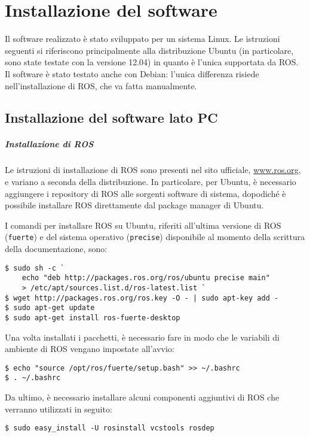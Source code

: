 \chapter{Installazione del software}
\label{cap:installazione}

Il software realizzato è stato sviluppato per un sistema Linux. Le istruzioni seguenti si riferiscono principalmente alla distribuzione Ubuntu (in particolare, sono state testate con la versione 12.04) in quanto è l'unica supportata da ROS. Il software è stato testato anche con Debian: l'unica differenza risiede nell'installazione di ROS, che va fatta manualmente.

\section{Installazione del software lato PC}
\paragraph{Installazione di ROS} Le istruzioni di installazione di ROS sono presenti nel sito ufficiale, \url{www.ros.org}, e variano a seconda della distribuzione. In particolare, per Ubuntu, è necessario aggiungere i repository di ROS alle sorgenti software di sistema, dopodiché è possibile installare ROS direttamente dal package manager di Ubuntu. 

\begin{nota} I comandi per installare ROS su Ubuntu, riferiti all'ultima versione di ROS (\verb|fuerte|) e del sistema operativo (\verb|precise|) disponibile al momento della scrittura della documentazione, sono:
\begin{verbatim}
$ sudo sh -c `
    echo "deb http://packages.ros.org/ros/ubuntu precise main" 
    > /etc/apt/sources.list.d/ros-latest.list `
$ wget http://packages.ros.org/ros.key -O - | sudo apt-key add -
$ sudo apt-get update
$ sudo apt-get install ros-fuerte-desktop
\end{verbatim}
Una volta installati i pacchetti, è necessario fare in modo che le variabili di ambiente di ROS vengano impostate all'avvio:
\begin{verbatim}
$ echo "source /opt/ros/fuerte/setup.bash" >> ~/.bashrc
$ . ~/.bashrc
\end{verbatim}
Da ultimo, è necessario installare alcuni componenti aggiuntivi di ROS che verranno utilizzati in seguito:
\begin{verbatim}
$ sudo easy_install -U rosinstall vcstools rosdep
\end{verbatim}
\end{nota}


